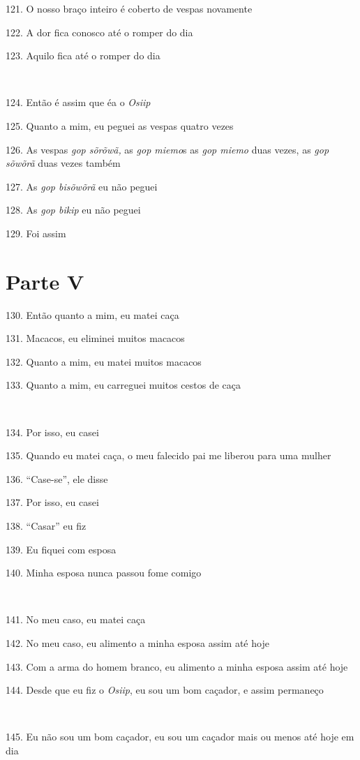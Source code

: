 121. O nosso braço inteiro é coberto de vespas novamente

122. A dor fica conosco até o romper do dia

123. Aquilo fica até o romper do dia

~

124. Então é assim que éa o \emph{Osiip}

125. Quanto a mim, eu peguei as vespas quatro vezes

126. As vespas \emph{gop sõrõwã,} as \emph{gop miemo}s as \emph{gop miemo} duas vezes, as \emph{gop sõwõrã} duas vezes também

127. As \emph{gop bisõwõrã} eu não peguei

128. As \emph{gop bikip} eu não peguei

129. Foi assim

\section{Parte V}

130. Então quanto a mim, eu matei caça

131. Macacos, eu eliminei muitos macacos

132. Quanto a mim, eu matei muitos macacos

133. Quanto a mim, eu carreguei muitos cestos de caça

~

134. Por isso, eu casei

135. Quando eu matei caça, o meu falecido pai me liberou para uma mulher

136. ``Case-se'', ele disse

137. Por isso, eu casei

138. ``Casar'' eu fiz

139. Eu fiquei com esposa

140.  Minha esposa nunca passou fome comigo

~

141. No meu caso, eu matei caça

142. No meu caso, eu alimento a minha esposa assim até hoje

143. Com a arma do homem branco, eu alimento a minha esposa assim até hoje

144. Desde que eu fiz o \emph{Osiip}, eu sou um bom caçador, e assim permaneço

~

145. Eu não sou um bom caçador, eu sou um caçador mais ou menos até hoje em dia

